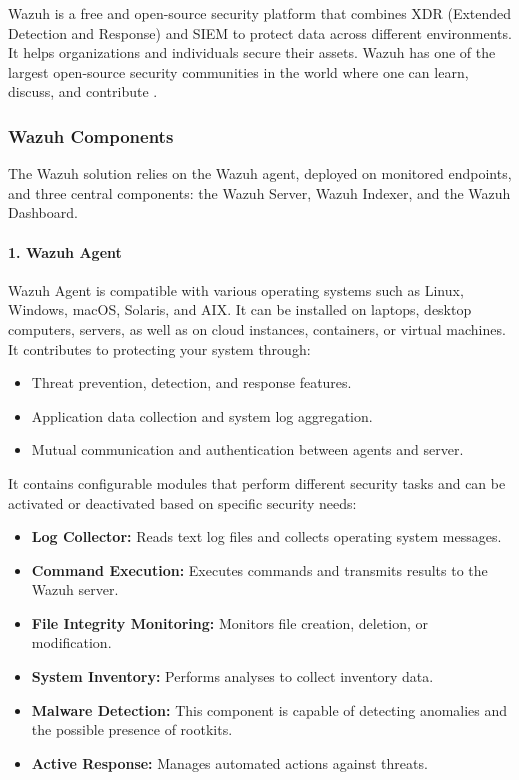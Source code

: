 Wazuh is a free and open-source security platform that combines XDR (Extended Detection and Response) and SIEM to protect data across different environments. It helps organizations and individuals secure their assets. Wazuh has one of the largest open-source security communities in the world where one can learn, discuss, and contribute \cite{wazuh-community}.

\subsubsection{Wazuh Components}
\label{subsubsec:wazuh-components}

The Wazuh solution relies on the Wazuh agent, deployed on monitored endpoints, and three central components: the Wazuh Server, Wazuh Indexer, and the Wazuh Dashboard.

\paragraph{1. Wazuh Agent \cite{wazuh-agent}}
\label{par:wazuh-agent}

Wazuh Agent is compatible with various operating systems such as Linux, Windows, macOS, Solaris, and AIX. It can be installed on laptops, desktop computers, servers, as well as on cloud instances, containers, or virtual machines. It contributes to protecting your system through:
\begin{itemize}
    \item Threat prevention, detection, and response features.
    \item Application data collection and system log aggregation.
    \item Mutual communication and authentication between agents and server.
\end{itemize}

It contains configurable modules that perform different security tasks and can be activated or deactivated based on specific security needs:
\begin{itemize}
    \item \textbf{Log Collector:} Reads text log files and collects operating system messages.
    \item \textbf{Command Execution:} Executes commands and transmits results to the Wazuh server.
    \item \textbf{File Integrity Monitoring:} Monitors file creation, deletion, or modification.
    \item \textbf{System Inventory:} Performs analyses to collect inventory data.
    \item \textbf{Malware Detection:} This component is capable of detecting anomalies and the possible presence of rootkits.
    \item \textbf{Active Response:} Manages automated actions against threats.
\end{itemize}


